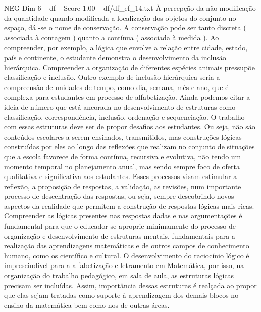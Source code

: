 \begin{textsample}{NEG Dim 6 – df – Score 1.00 – df/df\_ef\_14.txt}
À percepção da não modificação da quantidade quando modificada a localização dos objetos do conjunto no espaço, dá -se o nome de conservação.
A conservação pode ser tanto discreta ( associada à contagem ) quanto a contínua ( associada à medida ).
Ao compreender, por exemplo, a lógica que envolve a relação entre cidade, estado, país e continente, o estudante demonstra o desenvolvimento da inclusão hierárquica.
Compreender a organização de diferentes espécies animais pressupõe classificação e inclusão.
Outro exemplo de inclusão hierárquica seria a compreensão de unidades de tempo, como dia, semana, mês e ano, que é complexa para estudantes em processo de alfabetização.
Ainda podemos citar a ideia de número que está ancorada no desenvolvimento de estruturas como classificação, correspondência, inclusão, ordenação e sequenciação.
O trabalho com essas estruturas deve ser de propor desafios aos estudantes.
Ou seja, não são conteúdos escolares a serem ensinados, transmitidos, mas construções lógicas construídas por eles ao longo das reflexões que realizam no conjunto de situações que a escola favorece de forma contínua, recursiva e evolutiva, não tendo um momento temporal no planejamento anual, mas sendo sempre foco de oferta qualitativa e significativa aos estudantes.
Esses processos visam estimular a reflexão, a proposição de respostas, a validação, as revisões, num importante processo de descentração das respostas, ou seja, sempre descobrindo novos aspectos da realidade que permitem a construção de respostas lógicas mais ricas.
Compreender as lógicas presentes nas respostas dadas e nas argumentações é fundamental para que o educador se aproprie minimamente do processo de organização e desenvolvimento de estruturas mentais, fundamentais para a realização das aprendizagens matemáticas e de outros campos de conhecimento humano, como os científico e cultural.
O desenvolvimento do raciocínio lógico é imprescindível para a alfabetização e letramento em Matemática, por isso, na organização do trabalho pedagógico, em sala de aula, as estruturas lógicas precisam ser incluídas.
Assim, importância dessas estruturas é realçada ao propor que elas sejam tratadas como suporte à aprendizagem dos demais blocos no ensino da matemática bem como nos de outras áreas.

\end{textsample}
